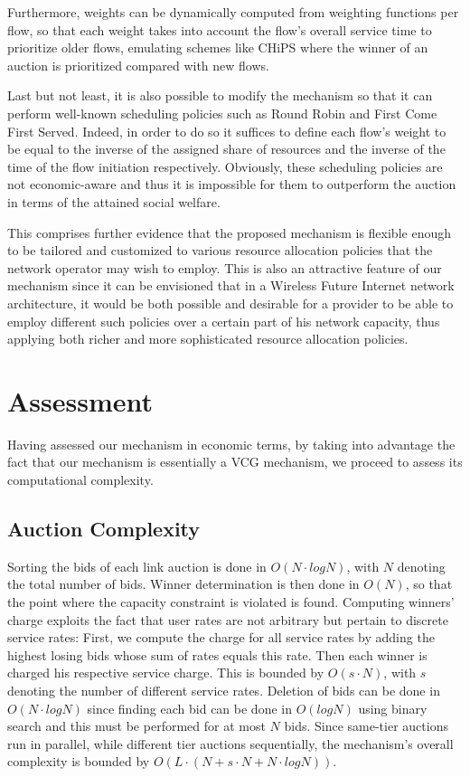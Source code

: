 \documentclass[a4paper]{article}
\begin{document}
Furthermore, weights can be dynamically computed from weighting functions per
flow, so that each weight takes into account the flow's
overall service time to prioritize older flows, emulating
schemes like CHiPS \cite{chips} where the winner of an auction is
prioritized compared with new flows.

Last but not least, it is also possible to modify the mechanism so that it
can perform well-known scheduling policies such as Round Robin and First
Come First Served. Indeed, in order to do so it suffices to define each flow's weight 
to be equal to the inverse of the assigned share of resources and the inverse 
of the time of the flow initiation respectively. Obviously, these scheduling
policies are not economic-aware and thus it is impossible for them to outperform
the auction in terms of the attained social welfare.

This comprises further evidence that the proposed mechanism is flexible enough to
be tailored and customized to various resource allocation policies that the 
network operator may wish to employ. This is also an attractive feature of our
mechanism since it can be envisioned that in a Wireless Future Internet network
architecture, it would be both possible and desirable for a provider to be able 
to employ different such policies over a certain part of his network capacity, thus
applying both richer and more sophisticated resource allocation policies.

\section{Assessment}\label{sec:assessment}

Having assessed our mechanism in economic terms, by taking into advantage 
the fact that our mechanism is essentially a VCG mechanism, we proceed to 
assess its computational complexity.

\subsection{Auction Complexity}
Sorting the bids of each link auction is done in $O(N \cdot logN)$, with $N$ denoting 
the total number of bids. Winner determination is then done in $O(N)$, so that the
point where the capacity constraint is violated is found. 
Computing winners' charge exploits the fact that user rates are not arbitrary but
pertain to discrete service rates: First, we compute the charge for all
service rates by adding the highest losing bids whose sum of rates equals this rate. 
Then each winner is charged his respective service charge. 
This
is bounded by $O(s \cdot N)$, with $s$ denoting the number of different service rates.
Deletion of bids can be done in $O(N \cdot logN)$ since finding each bid can be done in 
$O(logN)$ using binary search and this must be performed for at most $N$ bids.
Since same-tier auctions run in parallel, while different tier auctions sequentially, 
the mechanism's overall complexity is bounded by 
$O(L \cdot (N + s \cdot N  + N \cdot logN))$.
\end{document}
